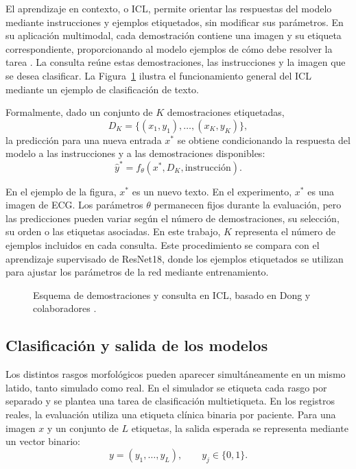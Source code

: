 El aprendizaje en contexto, o ICL, permite orientar las respuestas del modelo mediante instrucciones y ejemplos etiquetados, sin modificar sus parámetros. En su aplicación multimodal, cada demostración contiene una imagen y su etiqueta correspondiente, proporcionando al modelo ejemplos de cómo debe resolver la tarea \cite{dong2024survey}. La consulta reúne estas demostraciones, las instrucciones y la imagen que se desea clasificar. La Figura~\ref{fig:icl_context_related_work} ilustra el funcionamiento general del ICL mediante un ejemplo de clasificación de texto.

Formalmente, dado un conjunto de \(K\) demostraciones etiquetadas,
\begin{equation}
D_K=\{(x_1,y_1),\ldots,(x_K,y_K)\},
\end{equation}
la predicción para una nueva entrada \(x^\ast\) se obtiene condicionando la respuesta del modelo a las instrucciones y a las demostraciones disponibles:
\begin{equation}
\hat{y}^\ast=f_\theta\left(x^\ast,D_K,\text{instrucción}\right).
\end{equation}

En el ejemplo de la figura, \(x^\ast\) es un nuevo texto. En el experimento, \(x^\ast\) es una imagen de ECG. Los parámetros \(\theta\) permanecen fijos durante la evaluación, pero las predicciones pueden variar según el número de demostraciones, su selección, su orden o las etiquetas asociadas. En este trabajo, \(K\) representa el número de ejemplos incluidos en cada consulta. Este procedimiento se compara con el aprendizaje supervisado de ResNet18, donde los ejemplos etiquetados se utilizan para ajustar los parámetros de la red mediante entrenamiento.

\begin{figure}[H]
  \centering
  \caption{Esquema de demostraciones y consulta en ICL, basado en Dong y colaboradores \cite{dong2024survey}.}
  \label{fig:icl_context_related_work}
\end{figure}

\subsection{Clasificación y salida de los modelos}
\label{sec:clasificacion}

Los distintos rasgos morfológicos pueden aparecer simultáneamente en un mismo latido, tanto simulado como real. En el simulador se etiqueta cada rasgo por separado y se plantea una tarea de clasificación multietiqueta. En los registros reales, la evaluación utiliza una etiqueta clínica binaria por paciente. Para una imagen \(x\) y un conjunto de \(L\) etiquetas, la salida esperada se representa mediante un vector binario:
\begin{equation}
 y=(y_1,\ldots,y_L), \qquad y_j\in\{0,1\}.
\end{equation}


